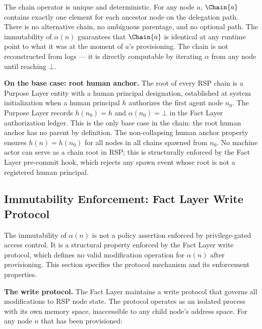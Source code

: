 The chain operator is unique and deterministic. For any node $a$, $\Chain{a}$ contains exactly one element for each ancestor node on the delegation path. There is no alternative chain, no ambiguous parentage, and no optional path. The immutability of $\alpha(n)$ guarantees that $\Chain{a}$ is identical at any runtime point to what it was at the moment of $a$'s provisioning. The chain is not reconstructed from logs --- it is directly computable by iterating $\alpha$ from any node until reaching $\bot$.

\begin{note}
\textbf{On the base case: root human anchor.}
The root of every RSP chain is a Purpose Layer entity with a human principal designation, established at system initialization when a human principal $h$ authorizes the first agent node $n_0$. The Purpose Layer records $h(n_0) = h$ and $\alpha(n_0) = \bot$ in the Fact Layer authorization ledger. This is the only base case in the chain: the root human anchor has no parent by definition. The non-collapsing human anchor property ensures $h(n) = h(n_0)$ for all nodes in all chains spawned from $n_0$. No machine actor can serve as a chain root in RSP; this is structurally enforced by the Fact Layer pre-commit hook, which rejects any spawn event whose root is not a registered human principal.
\end{note}

\subsection{Immutability Enforcement: Fact Layer Write Protocol}
\label{sec:fact-layer-write-protocol}

The immutability of $\alpha(n)$ is not a policy assertion enforced by privilege-gated access control. It is a structural property enforced by the Fact Layer write protocol, which defines no valid modification operation for $\alpha(n)$ after provisioning. This section specifies the protocol mechanism and its enforcement properties.

\medskip
\noindent\textbf{The write protocol.} The Fact Layer maintains a write protocol that governs all modifications to RSP node state. The protocol operates as an isolated process with its own memory space, inaccessible to any child node's address space. For any node $n$ that has been provisioned:

